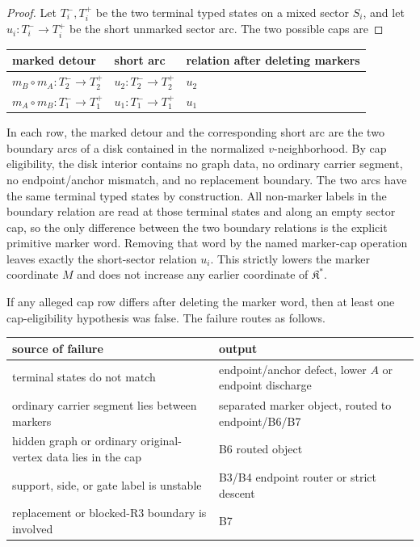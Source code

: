 \documentclass[11pt]{amsart}
\theoremstyle{definition}
\begin{document}
\begin{proof}
Let \(T_i^-,T_i^+\) be the two terminal typed states on a mixed sector \(S_i\), and let \(u_i:T_i^-\to T_i^+\) be the short unmarked sector arc. The two possible caps are

\end{proof}
\begin{center}
\begin{tabular}{p{}p{}p{}}
marked detour & short arc & relation after deleting markers \\ \hline
\(m_B\circ m_A:T_2^-\to T_2^+\) & \(u_2:T_2^-\to T_2^+\) & \(u_2\) \\
\(m_A\circ m_B:T_1^-\to T_1^+\) & \(u_1:T_1^-\to T_1^+\) & \(u_1\) \\
\end{tabular}
\end{center}

In each row, the marked detour and the corresponding short arc are the two boundary arcs of a disk contained in the normalized \(v\)-neighborhood. By cap eligibility, the disk interior contains no graph data, no ordinary carrier segment, no endpoint/anchor mismatch, and no replacement boundary. The two arcs have the same terminal typed states by construction. All non-marker labels in the boundary relation are read at those terminal states and along an empty sector cap, so the only difference between the two boundary relations is the explicit primitive marker word. Removing that word by the named marker-cap operation leaves exactly the short-sector relation \(u_i\). This strictly lowers the marker coordinate \(M\) and does not increase any earlier coordinate of \(\mathfrak K^\ast\).

If any alleged cap row differs after deleting the marker word, then at least one cap-eligibility hypothesis was false. The failure routes as follows.

\begin{center}
\begin{tabular}{p{}p{}}
source of failure & output \\ \hline
terminal states do not match & endpoint/anchor defect, lower \(A\) or endpoint discharge \\
ordinary carrier segment lies between markers & separated marker object, routed to endpoint/B6/B7 \\
hidden graph or ordinary original-vertex data lies in the cap & B6 routed object \\
support, side, or gate label is unstable & B3/B4 endpoint router or strict descent \\
replacement or blocked-R3 boundary is involved & B7 \\
\end{tabular}
\end{center}
\end{document}
